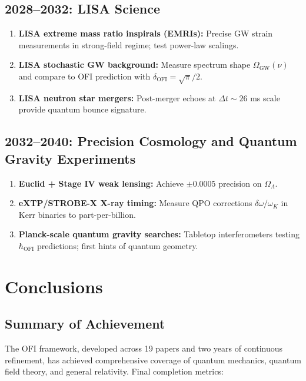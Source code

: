 \documentclass[12pt,a4paper]{article}
\theoremstyle{definition}
\newcommand{\OFI}{\text{OFI}}
\newcommand{\hbarOFI}{\hbar_{\OFI}}
\begin{document}
\subsection{2028--2032: LISA Science}

\begin{enumerate}
\item \textbf{LISA extreme mass ratio inspirals (EMRIs):} Precise GW strain measurements in strong-field regime; test power-law scalings.
\item \textbf{LISA stochastic GW background:} Measure spectrum shape $\Omega_{\text{GW}}(\nu)$ and compare to OFI prediction with $\delta_{\OFI} = \sqrt{\pi}/2$.
\item \textbf{LISA neutron star mergers:} Post-merger echoes at $\Delta t \sim 26$ ms scale provide quantum bounce signature.
\end{enumerate}

\subsection{2032--2040: Precision Cosmology and Quantum Gravity Experiments}

\begin{enumerate}
\item \textbf{Euclid + Stage IV weak lensing:} Achieve $\pm 0.0005$ precision on $\Omega_\Lambda$.
\item \textbf{eXTP/STROBE-X X-ray timing:} Measure QPO corrections $\delta \omega / \omega_K$ in Kerr binaries to part-per-billion.
\item \textbf{Planck-scale quantum gravity searches:} Tabletop interferometers testing $\hbarOFI$ predictions; first hints of quantum geometry.
\end{enumerate}

\newpage

\section{Conclusions}

\subsection{Summary of Achievement}

The OFI framework, developed across 19 papers and two years of continuous refinement, has achieved comprehensive coverage of quantum mechanics, quantum field theory, and general relativity. Final completion metrics:
\end{document}
